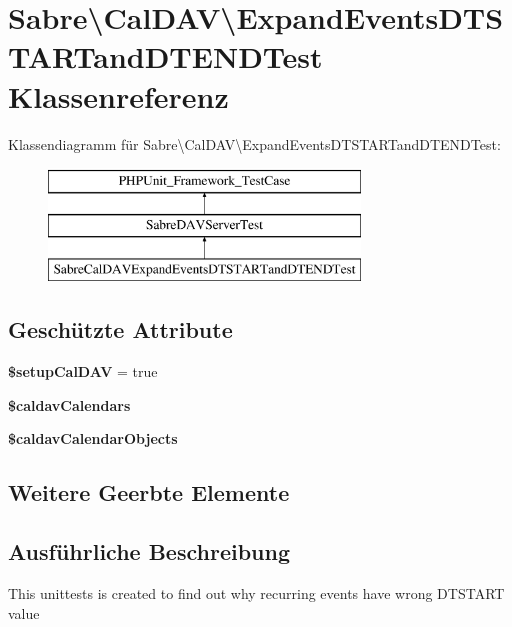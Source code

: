 \hypertarget{class_sabre_1_1_cal_d_a_v_1_1_expand_events_d_t_s_t_a_r_tand_d_t_e_n_d_test}{}\section{Sabre\textbackslash{}Cal\+D\+AV\textbackslash{}Expand\+Events\+D\+T\+S\+T\+A\+R\+Tand\+D\+T\+E\+N\+D\+Test Klassenreferenz}
\label{class_sabre_1_1_cal_d_a_v_1_1_expand_events_d_t_s_t_a_r_tand_d_t_e_n_d_test}
Klassendiagramm für Sabre\textbackslash{}Cal\+D\+AV\textbackslash{}Expand\+Events\+D\+T\+S\+T\+A\+R\+Tand\+D\+T\+E\+N\+D\+Test\+:\begin{figure}[H]
\begin{center}
\leavevmode
\includegraphics[height=3.000000cm]{class_sabre_1_1_cal_d_a_v_1_1_expand_events_d_t_s_t_a_r_tand_d_t_e_n_d_test}
\end{center}
\end{figure}
\subsection*{Geschützte Attribute}
\begin{DoxyCompactItemize}
\item 
\mbox{\label{class_sabre_1_1_cal_d_a_v_1_1_expand_events_d_t_s_t_a_r_tand_d_t_e_n_d_test_ac20abfb1a8a8c5662bf1f050c2faaa10}} 
{\bfseries \$setup\+Cal\+D\+AV} = true
\item 
{\bfseries \$caldav\+Calendars}
\item 
{\bfseries \$caldav\+Calendar\+Objects}
\end{DoxyCompactItemize}
\subsection*{Weitere Geerbte Elemente}


\subsection{Ausführliche Beschreibung}
This unittests is created to find out why recurring events have wrong D\+T\+S\+T\+A\+RT value

